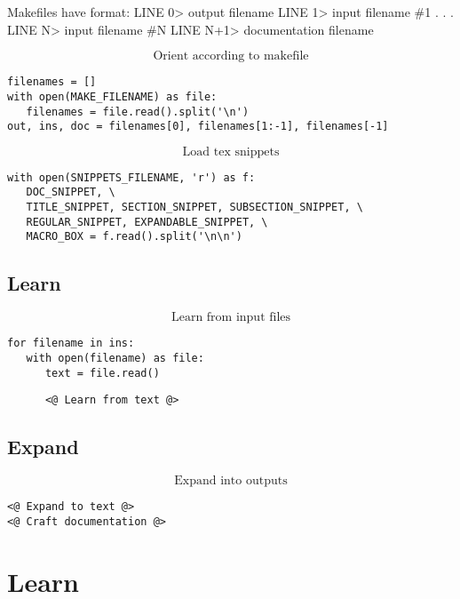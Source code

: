 \documentclass{article}
\begin{document}
Makefiles have format:
LINE 0> output filename
LINE 1> input filename \#1
. . .
LINE N> input filename \#N
LINE N+1> documentation filename

$$\boxed{\text{Orient according to makefile}}$${\color{YellowOrange}\begin{verbatim}filenames = []
with open(MAKE_FILENAME) as file:
   filenames = file.read().split('\n')
out, ins, doc = filenames[0], filenames[1:-1], filenames[-1]
\end{verbatim}}$$\boxed{\text{Load tex snippets}}$${\color{YellowOrange}\begin{verbatim}with open(SNIPPETS_FILENAME, 'r') as f:
   DOC_SNIPPET, \
   TITLE_SNIPPET, SECTION_SNIPPET, SUBSECTION_SNIPPET, \
   REGULAR_SNIPPET, EXPANDABLE_SNIPPET, \
   MACRO_BOX = f.read().split('\n\n')
\end{verbatim}}\subsection{Learn}

$$\boxed{\text{Learn from input files}}$${\color{YellowOrange}\begin{verbatim}for filename in ins:
   with open(filename) as file:
      text = file.read()
\end{verbatim}}{\color{MidnightBlue}\begin{verbatim}      <@ Learn from text @>
\end{verbatim}}\subsection{Expand}

$$\boxed{\text{Expand into outputs}}$${\color{MidnightBlue}\begin{verbatim}<@ Expand to text @>
<@ Craft documentation @>
\end{verbatim}}\section{Learn}
\end{document}
